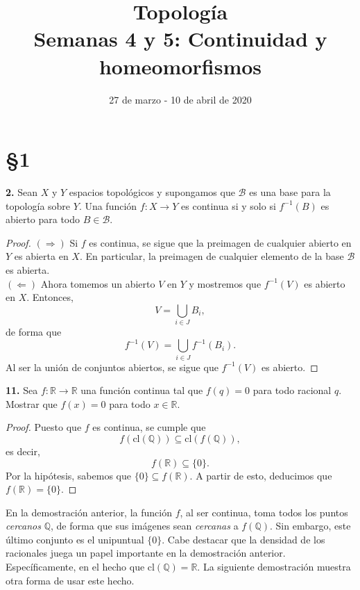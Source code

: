 \documentclass{article}
\begin{document}
\date{27 de marzo - 10 de abril de 2020}
\title{ \textbf{Topología} \\
Semanas 4 y 5: Continuidad y homeomorfismos}
\maketitle	

\section*{§1}

\begin{mybox}
	\textbf{2. } Sean $X$ y $Y$ espacios topológicos y supongamos que $\mathcal{B}$ es una base para la topología sobre $Y$. Una función $f: X \rightarrow Y$ es continua si y solo si $f^{-1}(B)$ es abierto para todo $B \in \mathcal{B}$.
\end{mybox}	
\begin{proof}
	$(\Rightarrow)$ Si $f$ es continua, se sigue que la preimagen de cualquier abierto en $Y$ es abierta en $X$. En particular, la preimagen de cualquier elemento de la base $\mathcal{B}$ es abierta.\\
	$(\Leftarrow)$ Ahora tomemos un abierto $V$ en $Y$ y mostremos que $f^{-1}(V)$ es abierto en $X$. Entonces,
	$$ V = \bigcup_{i \in J} B_{i} ,$$
	de forma que 
	$$ f^{-1}(V) = \bigcup_{i \in J} f^{-1}(B_{i}) .$$
	Al ser la unión de conjuntos abiertos, se sigue que $f^{-1}(V)$ es abierto. 
\end{proof}

\begin{mybox}
	\textbf{11. } Sea $f: \mathbb{R} \rightarrow \mathbb{R}$ una función continua tal que $f(q) = 0$ para todo racional $q$. Mostrar que $f(x) = 0$ para todo $x \in \mathbb{R}$.  	
\end{mybox}	

\begin{proof}
	Puesto que $f$ es continua, se cumple que 
	$$ f(\text{cl}(\mathbb{Q})) \subseteq \text{cl}(f(\mathbb{Q})), $$
	es decir,
	$$ f(\mathbb{R}) \subseteq \{ 0 \}. $$
	Por la hipótesis, sabemos que $\{0 \} \subseteq f(\mathbb{R})$. A partir de esto, deducimos que $f(\mathbb{R}) = \{ 0 \}$.
\end{proof}

En la demostración anterior, la función $f$, al ser continua, toma todos los puntos \textit{cercanos} $\mathbb{Q}$, de forma que sus imágenes sean \textit{cercanas} a $f(\mathbb{Q})$. Sin embargo, este último conjunto es el unipuntual $\{ 0 \}$. Cabe destacar que la densidad de los racionales juega un papel importante en la demostración anterior. Específicamente, en el hecho que $\text{cl}(\mathbb{Q}) = \mathbb{R}$. La siguiente demostración muestra otra forma de usar este hecho.  
\end{document}
